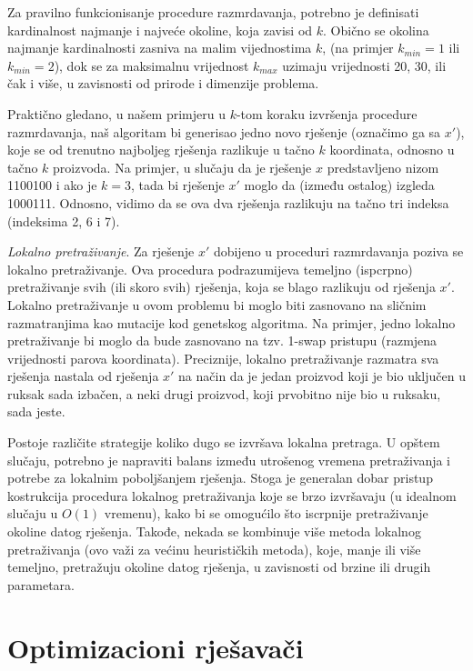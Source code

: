 \documentclass[a4paper, utf8, 11pt, colorlinks]{book}
\begin{document}
Za pravilno funkcionisanje procedure razmrdavanja, potrebno je definisati kardinalnost najmanje i najveće okoline, koja zavisi od $k$. Obično se okolina najmanje kardinalnosti zasniva na malim vijednostima $k$, (na primjer $k_{min}=1$ ili $k_{min}=2$), dok se za maksimalnu vrijednost $k_{max}$  uzimaju vrijednosti 20, 30, ili čak i više, u zavisnosti od prirode i dimenzije problema.

Praktično gledano, u našem primjeru u $k$-tom koraku izvršenja procedure razmrdavanja, naš algoritam bi generisao jedno novo rješenje (označimo ga sa $x'$), koje se od trenutno najboljeg rješenja razlikuje u tačno $k$ koordinata, odnosno u tačno $k$ proizvoda. Na primjer, u slučaju da je rješenje $x$ predstavljeno nizom 1100100 i ako je $k=3$, tada bi rješenje    $x'$ moglo da  (između ostalog) izgleda
1000111. Odnosno, vidimo da se ova dva rješenja razlikuju na tačno tri indeksa (indeksima 2, 6 i 7).

\emph{Lokalno pretraživanje}. 
Za rješenje  $x'$ dobijeno u  proceduri razmrdavanja poziva se lokalno pretraživanje. Ova procedura podrazumijeva temeljno (ispcrpno) pretraživanje svih (ili skoro svih) rješenja, koja se blago razlikuju od rješenja  $x'$. Lokalno pretraživanje u ovom problemu bi moglo biti zasnovano na sličnim razmatranjima kao mutacije kod genetskog algoritma. Na primjer, jedno lokalno pretraživanje bi moglo da bude zasnovano na tzv. 1-swap pristupu (razmjena vrijednosti parova koordinata). Preciznije, lokalno pretraživanje razmatra sva rješenja nastala od rješenja $x'$ na način da je jedan proizvod koji je bio uključen u ruksak sada izbačen, a neki drugi proizvod, koji prvobitno nije bio u ruksaku, sada jeste.

Postoje različite strategije koliko dugo se izvršava lokalna pretraga. U opštem slučaju, potrebno je napraviti balans između utrošenog vremena pretraživanja i potrebe za lokalnim poboljšanjem rješenja. Stoga je generalan dobar pristup kostrukcija  procedura lokalnog pretraživanja koje se brzo izvršavaju (u idealnom slučaju u $O(1)$ vremenu), kako bi se omogućilo što iscrpnije pretraživanje okoline datog rješenja. Takođe, nekada se kombinuje više metoda lokalnog pretraživanja (ovo važi za većinu heurističkih metoda), koje, manje ili više temeljno, pretražuju okoline datog rješenja, u zavisnosti od brzine ili drugih parametara.

 \chapter{Optimizacioni rješavači}
 
\end{document}
